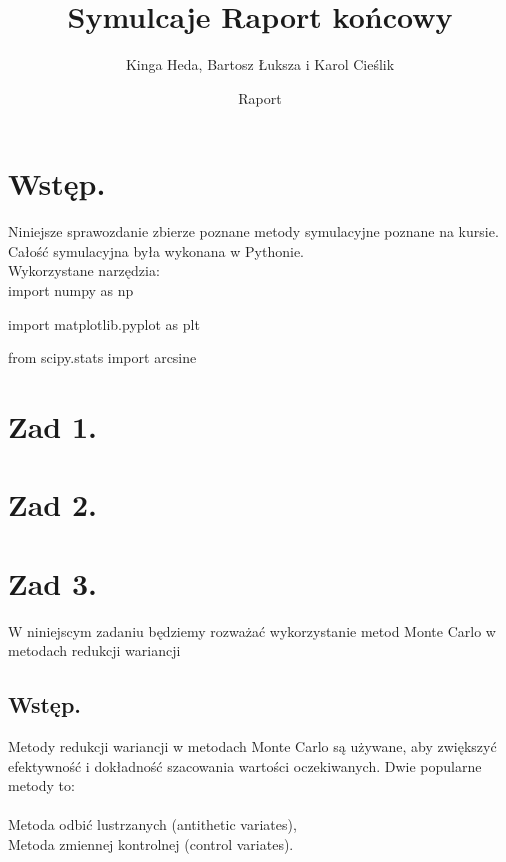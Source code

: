 \documentclass[12pt,letterpaper]{article}
\title{Symulcaje Raport końcowy}
\author{Kinga Heda, Bartosz Łuksza i Karol Cieślik}
\date{Raport}
\theoremstyle{definition}
\begin{document}
\setcounter{page}{1} %
\maketitle


\tableofcontents


%





\section{Wstęp.}
Niniejsze sprawozdanie zbierze poznane metody symulacyjne poznane na kursie.
Całość symulacyjna była wykonana w Pythonie.\\

Wykorzystane narzędzia:\\

import numpy as np

import matplotlib.pyplot as plt

from scipy.stats import arcsine

\section{Zad 1.}
\section{Zad 2.}
\section{Zad 3.}
W niniejscym zadaniu będziemy rozważać wykorzystanie metod Monte Carlo w metodach redukcji wariancji

\subsection{Wstęp.}

Metody redukcji wariancji w metodach Monte Carlo są używane, aby zwiększyć efektywność i dokładność szacowania wartości oczekiwanych. Dwie popularne metody to:\\
\\
Metoda odbić lustrzanych (antithetic variates),\\
Metoda zmiennej kontrolnej (control variates).\\
\end{document}
